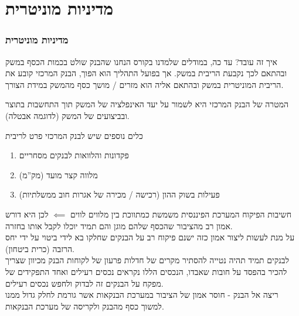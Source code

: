 \documentclass[usenames,dvipsnames,10pt]{beamer}
\begin{document}
\begin{RTL}
\begin{frame}[allowframebreaks]
\end{frame}


\section{מדיניות מוניטרית}
\begin{frame}[allowframebreaks]
    \frametitle{מדיניות מוניטרית}
    \begin{block}{איך זה עובד?}
        עד כה, במודלים שלמדנו בקורס הנחנו שהבנק שולט בכמות הכסף במשק ובהתאם לכך נקבעת הריבית במשק.
    אך בפועל התהליך הוא הפוך, הבנק המרכזי קובע את הריבית המוניטרית במשק ובהתאם אליה הוא מזרים / מושך כסף מהמשק במידת הצורך.


    \end{block}
    המטרה של הבנק המרכזי היא לשמור על יעד האינפלציה של המשק תוך התחשבות בתוצר ובביצועים של המשק (לדוגמה אבטלה).

    \begin{block}{כלים נוספים שיש לבנק המרכזי פרט לריבית}
        \begin{enumerate}
            \item פקדונות והלוואות לבנקים מסחריים
            \item מלווה קצר מועד (מק''מ)
            \item פעילות בשוק ההון (רכישה / מכירה של אגרות חוב ממשלתיות)
        \end{enumerate}
    \end{block}
    
    \framebreak
    \begin{block}{חשיבות הפיקוח}
        המערכת הפיננסית משמשת כמתווכת בין מלווים לווים $\impliedby$ לכן היא דורש אמון רב מהציבור שהכסף שלהם מוגן והם תמיד יוכלו לקבל אותו בחזרה.
        \newline
        \\
        על מנת לעשות ליצור אמון כזה ישנם פיקוח רב על הבנקים שחלקו בא לידי ביטוי על ידי יחס הרזבה (כרית ביטחון).
        \newline
        \\
        לבנקים תמיד תהיה נטייה להסתיר מקרים של חדלות פרעון של לקוחות הבנק מכיוון שצריך להכיר בהפסד על חובות שאבדו, הנכסים הללו נקראים נכסים רעילים ואחד התפקידים של מפקח על הבנקים זה לבדוק ולחפש נכסים רעילים.
        \newline
        \\
        ריצה אל הבנק - חוסר אמון של הציבור במערכת הבנקאות אשר גורמת לחלק גדול ממנו למשוך כסף מהבנק ולקריסה של מערכת הבנקאות.
    \end{block}



\end{frame}
\end{RTL}
\end{document}
